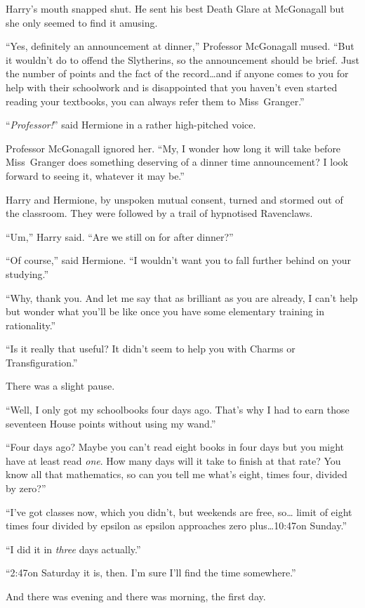 Harry’s mouth snapped shut. He sent his best Death Glare at McGonagall but she
only seemed to find it amusing.

“Yes, definitely an announcement at dinner,” Professor McGonagall mused. “But
it wouldn’t do to offend the Slytherins, so the announcement should be brief.
Just the number of points and the fact of the record…and if anyone
comes to you for help with their schoolwork and is disappointed that you
haven’t even started reading your textbooks, you can always refer them to
Miss~Granger.”

“\emph{Professor!}” said Hermione in a rather high-pitched voice.

Professor McGonagall ignored her. “My, I wonder how long it will take before
Miss~Granger does something deserving of a dinner time announcement? I look
forward to seeing it, whatever it may be.”

Harry and Hermione, by unspoken mutual consent, turned and stormed out of the
classroom. They were followed by a trail of hypnotised Ravenclaws.

“Um,” Harry said. “Are we still on for after dinner?”

“Of course,” said Hermione. “I wouldn’t want you to fall further behind on your
studying.”

“Why, thank you. And let me say that as brilliant as you are already, I can’t
help but wonder what you’ll be like once you have some elementary training in
rationality.”

“Is it really that useful? It didn’t seem to help you with Charms or
Transfiguration.”

There was a slight pause.

“Well, I only got my schoolbooks four days ago. That’s why I had to earn those
seventeen House points without using my wand.”

“Four days ago? Maybe you can’t read eight books in four days but you might
have at least read \emph{one}. How many days will it take to finish at that
rate? You know all that mathematics, so can you tell me what’s eight, times
four, divided by zero?”

“I’ve got classes now, which you didn’t, but weekends are free, so…
limit of eight times four divided by epsilon as epsilon approaches zero
plus…10:47\AM on Sunday.”

“I did it in \emph{three} days actually.”

“2:47\PM on Saturday it is, then. I’m sure I’ll find the time somewhere.”

And there was evening and there was morning, the first day.
